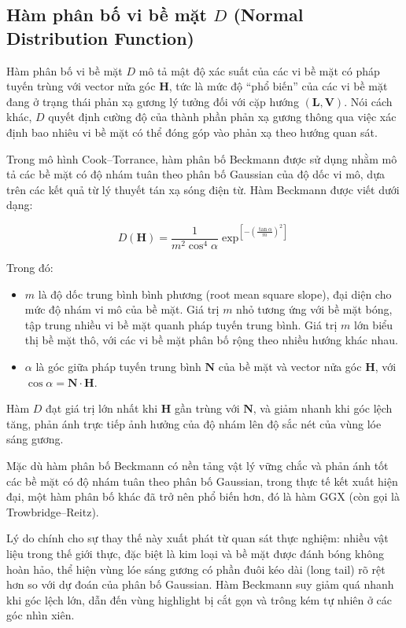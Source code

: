 \subsection{Hàm phân bố vi bề mặt $D$ (Normal Distribution Function)}

Hàm phân bố vi bề mặt $D$ mô tả mật độ xác suất của các vi bề mặt có pháp tuyến trùng với vector nửa góc $\mathbf{H}$, tức là mức độ “phổ biến” của các vi bề mặt đang ở trạng thái phản xạ gương lý tưởng đối với cặp hướng $(\mathbf{L}, \mathbf{V})$. Nói cách khác, $D$ quyết định cường độ của thành phần phản xạ gương thông qua việc xác định bao nhiêu vi bề mặt có thể đóng góp vào phản xạ theo hướng quan sát.

Trong mô hình Cook–Torrance, hàm phân bố Beckmann được sử dụng nhằm mô tả các bề mặt có độ nhám tuân theo phân bố Gaussian của độ dốc vi mô, dựa trên các kết quả từ lý thuyết tán xạ sóng điện từ. Hàm Beckmann được viết dưới dạng:

\begin{equation}
	D(\mathbf{H}) = \frac{1}{m^2 \cos^4 \alpha} \exp^{[-(\frac{\tan \alpha}{m})^2]}
\end{equation}

Trong đó:
\begin{itemize}
	\item $m$ là độ dốc trung bình bình phương (root mean square slope), đại diện cho mức độ nhám vi mô của bề mặt. Giá trị $m$ nhỏ tương ứng với bề mặt bóng, tập trung nhiều vi bề mặt quanh pháp tuyến trung bình. Giá trị $m$ lớn biểu thị bề mặt thô, với các vi bề mặt phân bố rộng theo nhiều hướng khác nhau.
	\item $\alpha$ là góc giữa pháp tuyến trung bình $\mathbf{N}$ của bề mặt và vector nửa góc $\mathbf{H}$, với $\cos \alpha = \mathbf{N} \cdot \mathbf{H}$.
\end{itemize}

Hàm $D$ đạt giá trị lớn nhất khi $\mathbf{H}$ gần trùng với $\mathbf{N}$, và giảm nhanh khi góc lệch tăng, phản ánh trực tiếp ảnh hưởng của độ nhám lên độ sắc nét của vùng lóe sáng gương.

Mặc dù hàm phân bố Beckmann có nền tảng vật lý vững chắc và phản ánh tốt các bề mặt có độ nhám tuân theo phân bố Gaussian, trong thực tế kết xuất hiện đại, một hàm phân bố khác đã trở nên phổ biến hơn, đó là hàm GGX (còn gọi là Trowbridge--Reitz).

Lý do chính cho sự thay thế này xuất phát từ quan sát thực nghiệm: nhiều vật liệu trong thế giới thực, đặc biệt là kim loại và bề mặt được đánh bóng không hoàn hảo, thể hiện vùng lóe sáng gương có phần đuôi kéo dài (long tail) rõ rệt hơn so với dự đoán của phân bố Gaussian. Hàm Beckmann suy giảm quá nhanh khi góc lệch lớn, dẫn đến vùng highlight bị cắt gọn và trông kém tự nhiên ở các góc nhìn xiên.

